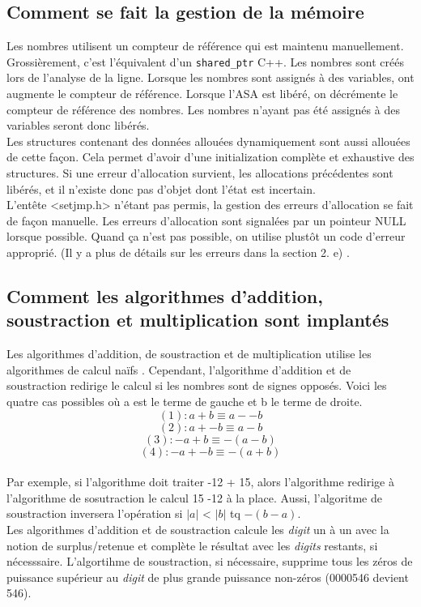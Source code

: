 \documentclass[a4paper,12pt,french]{article}
\begin{document}
	\subsection{Comment se fait la gestion de la mémoire}
		Les nombres utilisent un compteur de référence qui est maintenu manuellement. Grossièrement,
		c'est l'équivalent d'un \lstinline$shared_ptr$ C++. Les nombres sont créés lors de l'analyse de la
		ligne. Lorsque les nombres sont assignés à des variables, ont augmente le compteur de
		référence. Lorsque l'ASA est libéré, on décrémente le compteur de référence des nombres.
		Les nombres n'ayant pas été assignés à des variables seront donc libérés.\\

		Les structures contenant des données allouées dynamiquement sont aussi allouées de cette
		façon. Cela permet d'avoir d'une initialization complète et exhaustive des structures.
		Si une erreur d'allocation survient, les allocations précédentes sont libérés, et il
		n'existe donc pas d'objet dont l'état est incertain.\\

		L'entête <setjmp.h> n'étant pas permis, la gestion des erreurs d'allocation se fait de
		façon manuelle. Les erreurs d'allocation sont signalées par un pointeur NULL lorsque
		possible. Quand ça n'est pas possible, on utilise plustôt un code d'erreur approprié.
		(Il y a plus de détails sur les erreurs dans la section 2. e) .\\
	\subsection{Comment les algorithmes d’addition, soustraction et multiplication sont implantés}
		Les algorithmes d'addition, de soustraction et de multiplication utilise les algorithmes de calcul \og naïfs \fg{}.
		Cependant, l'algorithme d'addition et de soustraction redirige le calcul si les nombres sont de signes opposés. Voici les quatre cas possibles où a est le terme de gauche et b le terme de droite.
		\[ (1) : a + b \equiv a - -b\]
		\[ (2) : a + -b \equiv a - b  \]
		\[ (3) : -a + b \equiv -(a-b) \]
		\[ (4) : -a + -b \equiv -(a+b) \]
		\\Par exemple, si l'algorithme doit traiter -12 + 15, alors l'algorithme redirige à l'algorithme de sosutraction le calcul 15 -12 à la place. Aussi, l'algoritme de soustraction inversera l'opération si $|a|$ < $|b|$ tq $-(b-a)$.\\

		Les algorithmes d'addition et de soustraction calcule les \textit{digit} un à un avec la notion de surplus/retenue et complète le résultat avec les \textit{digits} restants, si nécesssaire. L'algortihme de soustraction, si nécessaire, supprime tous les zéros de puissance supérieur au \textit{digit} de plus grande puissance non-zéros (0000546 devient 546).\\
\end{document}
